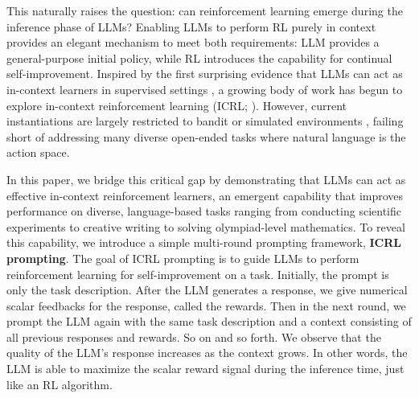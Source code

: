 \documentclass{article} %
\newcommand{\0}{\mathbf{0}}
\begin{document}
This naturally raises the question: can reinforcement learning emerge during the inference phase of LLMs? Enabling LLMs to perform RL purely in context provides an elegant mechanism to meet both requirements: LLM provides a general-purpose initial policy, while RL introduces the capability for continual self-improvement. Inspired by the first surprising evidence that LLMs can act as in-context learners in supervised settings \citep{ICL}, a growing body of work has begun to explore in-context reinforcement learning (ICRL; \citet{moeini2025survey}). However, current instantiations are largely restricted to bandit or simulated environments \citep{monea2025llmsincontextbanditreinforcement, krishnamurthy2024can}, failing short of addressing many diverse open-ended tasks where natural language is the action space. 

 

In this paper, we bridge this critical gap by demonstrating that LLMs can act as effective in-context reinforcement learners, an emergent capability that improves performance on diverse, language-based tasks ranging from conducting scientific experiments to creative writing to solving olympiad-level mathematics. To reveal this capability, we introduce a simple multi-round prompting framework, \textbf{ICRL prompting}.
The goal of ICRL prompting is to guide LLMs to perform reinforcement learning for self-improvement on a task.
Initially,
the prompt is only the task description.
After the LLM generates a response,
we give numerical scalar feedbacks for the response,
called the rewards.
Then in the next round,
we prompt the LLM again with the same task description and a context consisting of all previous responses and rewards.
So on and so forth.
We observe that the quality of the LLM's response increases as the context grows.
In other words,
the LLM is able to maximize the scalar reward signal during the inference time,
just like an RL algorithm.
\end{document}
